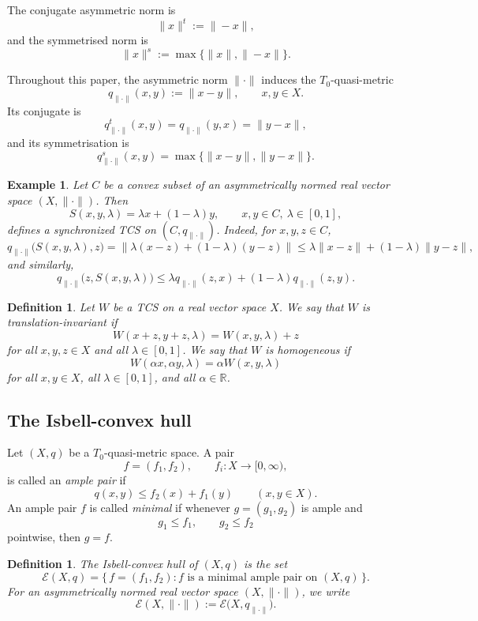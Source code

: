 \documentclass[preprint,12pt]{elsarticle}
\numberwithin{equation}{section}
\newtheorem{definition}[theorem]{Definition}
\newtheorem{example}[theorem]{Example}
\newcommand{\E}{\mathcal{E}}
\begin{document}
The conjugate asymmetric norm is
\[
\|x\|^{t}:=\|-x\|,
\]
and the symmetrised norm is
\[
\|x\|^{s}:=\max\{\|x\|,\|-x\|\}.
\]

Throughout this paper, the asymmetric norm \(\|\cdot\|\) induces the
\(T_{0}\)-quasi-metric
\[
q_{\|\cdot\|}(x,y):=\|x-y\|,
\qquad x,y\in X.
\]
Its conjugate is
\[
q_{\|\cdot\|}^{t}(x,y)=q_{\|\cdot\|}(y,x)=\|y-x\|,
\]
and its symmetrisation is
\[
q_{\|\cdot\|}^{s}(x,y)
=
\max\{\|x-y\|,\|y-x\|\}.
\]

\begin{example}\label{ex:standard-affine}
Let \(C\) be a convex subset of an asymmetrically normed real vector space
\((X,\|\cdot\|)\).  Then
\[
S(x,y,\lambda)=\lambda x+(1-\lambda)y,
\qquad x,y\in C,\ \lambda\in[0,1],
\]
defines a synchronized TCS on \((C,q_{\|\cdot\|})\).  Indeed, for
\(x,y,z\in C\),
\[
q_{\|\cdot\|}\bigl(S(x,y,\lambda),z\bigr)
=
\|\lambda(x-z)+(1-\lambda)(y-z)\|
\le
\lambda\|x-z\|+(1-\lambda)\|y-z\|,
\]
and similarly,
\[
q_{\|\cdot\|}\bigl(z,S(x,y,\lambda)\bigr)
\le
\lambda q_{\|\cdot\|}(z,x)+(1-\lambda)q_{\|\cdot\|}(z,y).
\]
\end{example}

\begin{definition}\label{def:TIH}
Let \(W\) be a TCS on a real vector space \(X\).  We say that \(W\) is
\emph{translation-invariant} if
\[
W(x+z,y+z,\lambda)=W(x,y,\lambda)+z
\]
for all \(x,y,z\in X\) and all \(\lambda\in[0,1]\).  We say that \(W\) is
\emph{homogeneous} if
\[
W(\alpha x,\alpha y,\lambda)=\alpha W(x,y,\lambda)
\]
for all \(x,y\in X\), all \(\lambda\in[0,1]\), and all
\(\alpha\in\mathbb R\).
\end{definition}

\subsection{The Isbell-convex hull}
\label{subsec:isbell}

Let \((X,q)\) be a \(T_{0}\)-quasi-metric space.  A pair
\[
f=(f_1,f_2),\qquad f_i:X\to[0,\infty),
\]
is called an \emph{ample pair} if
\[
q(x,y)\le f_2(x)+f_1(y)
\qquad (x,y\in X).
\]
An ample pair \(f\) is called \emph{minimal} if whenever \(g=(g_1,g_2)\) is
ample and
\[
g_1\le f_1,\qquad g_2\le f_2
\]
pointwise, then \(g=f\).

\begin{definition}\label{def:IsbellHull}
The \emph{Isbell-convex hull} of \((X,q)\) is the set
\[
\mathcal E(X,q)
=
\{\,f=(f_1,f_2): f \text{ is a minimal ample pair on }(X,q)\,\}.
\]
For an asymmetrically normed real vector space \((X,\|\cdot\|)\), we write
\[
\E(X,\|\cdot\|)
:=
\mathcal E\bigl(X,q_{\|\cdot\|}\bigr).
\]
\end{definition}
\end{document}
